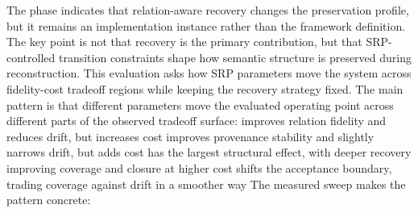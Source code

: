 {}
\markdownRendererSectionEnd \markdownRendererSectionBegin
{}\markdownRendererInterblockSeparator
{}The phase indicates that relation-aware recovery changes the preservation profile, but it remains an implementation instance rather than the framework definition. The key point is not that recovery is the primary contribution, but that SRP-controlled transition constraints shape how semantic structure is preserved during reconstruction.\markdownRendererInterblockSeparator
{}
\markdownRendererSectionEnd 
\markdownRendererSectionEnd \markdownRendererSectionBegin
{}\markdownRendererInterblockSeparator
{}This evaluation asks how SRP parameters move the system across fidelity-cost tradeoff regions while keeping the recovery strategy fixed.\markdownRendererParagraphSeparator
{}The main pattern is that different parameters move the evaluated operating point across different parts of the observed tradeoff surface:\markdownRendererInterblockSeparator
{}\markdownRendererUlBeginTight
\markdownRendererUlItem {} improves relation fidelity and reduces drift, but increases cost\markdownRendererUlItemEnd 
\markdownRendererUlItem {} improves provenance stability and slightly narrows drift, but adds cost\markdownRendererUlItemEnd 
\markdownRendererUlItem {} has the largest structural effect, with deeper recovery improving coverage and closure at higher cost\markdownRendererUlItemEnd 
\markdownRendererUlItem {} shifts the acceptance boundary, trading coverage against drift in a smoother way\markdownRendererUlItemEnd 
\markdownRendererUlEndTight \markdownRendererInterblockSeparator
{}The measured sweep makes the pattern concrete:\markdownRendererInterblockSeparator
